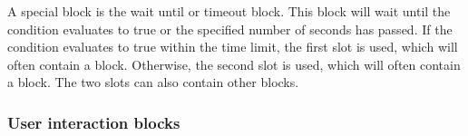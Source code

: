 \documentclass[../main]{subfiles}
\begin{document}
\begin{scratch}[scale=0.6,else word={}]
\end{scratch}

A special block is the wait until or timeout block.
This block will wait until the condition evaluates to true or the specified number of seconds has passed.
If the condition evaluates to true within the time limit, the first slot is used, which will often contain a  block.
Otherwise, the second slot is used, which will often contain a  block.
The two slots can also contain other blocks.

\subsubsection{User interaction blocks}

\begin{varwidth}{0.20\linewidth}
    \begin{scratch}[scale=0.6]
    \end{scratch}
\end{varwidth}%
\hspace{1em}%
\begin{varwidth}{0.28\linewidth}
    \begin{scratch}[scale=0.6]
    \end{scratch}
\end{varwidth}%
\hspace{1em}%
\begin{varwidth}{0.3\linewidth}
    \begin{scratch}[scale=0.6]
    \end{scratch}
\end{varwidth}

\begin{varwidth}{0.5\linewidth}
    \begin{scratch}[scale=0.6]
    \end{scratch}
\end{varwidth}%
\hspace{1em}%
\begin{varwidth}{0.5\linewidth}
    \begin{scratch}[scale=0.6]
    \end{scratch}
\end{varwidth}%
\end{document}
